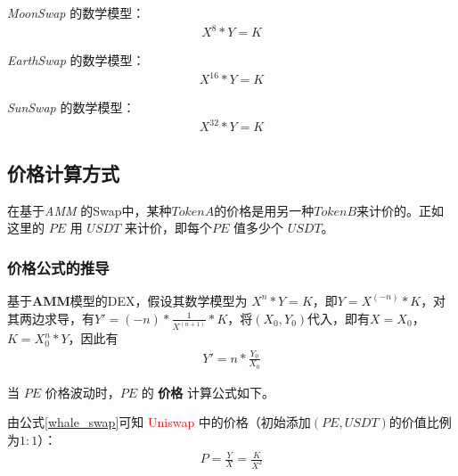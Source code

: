 \documentclass{article}
\begin{document}
\emph{MoonSwap} 的数学模型：
\begin{equation} \label{moon_swap}
\begin{split}
X^8 * Y = K
\end{split}
\end{equation}

\emph{EarthSwap} 的数学模型：
\begin{equation} \label{earth_swap}
\begin{split}
X^{16} * Y = K
\end{split}
\end{equation}

\emph{SunSwap} 的数学模型：
\begin{equation} \label{sun_swap}
\begin{split}
X^{32} * Y = K
\end{split}
\end{equation}



\subsection{价格计算方式}

在基于\emph{AMM} 的Swap中，某种$TokenA$的价格是用另一种$TokenB$来计价的。正如这里的 $PE$ 用 $USDT$ 来计价，即每个$PE$ 值多少个 $USDT$。

\subsubsection*{价格公式的推导}
基于\textbf{AMM}模型的DEX，假设其数学模型为 $X^n * Y = K$，即$Y = X^(-n) * K$，对其两边求导，有$Y' = (-n) * \frac{1}{X^(n+1)} * K$，将$(X_0, Y_0)$代入，即有$X = X_0$，$K = X_0^n * Y$，因此有
\begin{equation} \label{price_calu}
\begin{split}
Y' = n * \frac{Y_0}{X_0}
\end{split}
\end{equation}

当 $PE$ 价格波动时，$PE$ 的 \textbf{价格} 计算公式如下。

由公式\ref{whale_swap}可知 \textcolor{red}{Uniswap} 中的价格（初始添加$(PE, USDT)$的价值比例为$1:1$）：
\begin{equation} \label{uniswap_price}
\begin{split}
P = \frac{Y}{X} = \frac{K}{X^2}
\end{split}
\end{equation}
\end{document}
